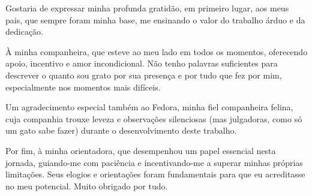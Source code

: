 \begin{agradecimentos}

Gostaria de expressar minha profunda gratidão, em primeiro lugar, aos meus pais, que sempre foram minha base, me ensinando o valor do trabalho árduo e da dedicação.

À minha companheira, que esteve ao meu lado em todos os momentos, oferecendo apoio, incentivo e amor incondicional. Não tenho palavras suficientes para descrever o quanto sou grato por sua presença e por tudo que fez por mim, especialmente nos momentos mais difíceis.

Um agradecimento especial também ao Fedora, minha fiel companheira felina, cuja companhia trouxe leveza e observações silenciosas (mas julgadoras, como só um gato sabe fazer) durante o desenvolvimento deste trabalho.

Por fim, à minha orientadora, que desempenhou um papel essencial nesta jornada, guiando-me com paciência e incentivando-me a superar minhas próprias limitações. Seus elogios e orientações foram fundamentais para que eu acreditasse no meu potencial. Muito obrigado por tudo.

\end{agradecimentos}
